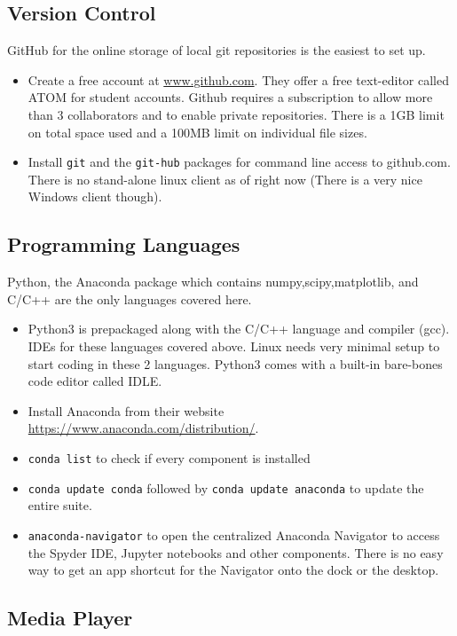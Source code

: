 \documentclass[10pt,letterpaper,twocolumn]{article}
\begin{document}
\subsection{Version Control}

GitHub for the online storage of local git repositories is the easiest to set up.

\begin{itemize}
	\item Create a free account at \url{www.github.com}. They offer a free text-editor called ATOM for student accounts. Github requires a subscription to allow more than 3 collaborators and to enable private repositories. There is a 1GB limit on total space used and a 100MB limit on individual file sizes.
	\item Install \texttt{git} and the \texttt{git-hub} packages for command line access to github.com. There is no stand-alone linux client as of right now (There is a very nice Windows client though).
\end{itemize}

\subsection{Programming Languages}
Python, the Anaconda package which contains numpy,scipy,matplotlib, and C/C++ are the only languages covered here.

\begin{itemize}
	\item Python3 is prepackaged along with the C/C++ language and compiler (gcc). IDEs for these languages covered above. Linux needs very minimal setup to start coding in these 2 languages. Python3 comes with a built-in bare-bones code editor called IDLE. 
	\item Install Anaconda from their website \\ \url{https://www.anaconda.com/distribution/}. 
	\item \texttt{conda list} to check if every component is installed
	\item \texttt{conda update conda} followed by \texttt{conda update anaconda} to update the entire suite.
	\item \texttt{anaconda-navigator} to open the centralized Anaconda Navigator to access the Spyder IDE, Jupyter notebooks and other components. There is no easy way to get an app shortcut for the Navigator onto the dock or the desktop.
\end{itemize}

\subsection{Media Player}
\end{document}

